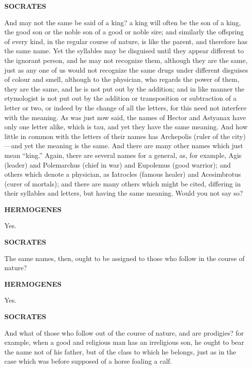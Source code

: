 \documentclass[11pt,letter]{article}
\begin{document}
\par \textbf{SOCRATES}
\par   And may not the same be said of a king? a king will often be the son of a king, the good son or the noble son of a good or noble sire; and similarly the offspring of every kind, in the regular course of nature, is like the parent, and therefore has the same name. Yet the syllables may be disguised until they appear different to the ignorant person, and he may not recognize them, although they are the same, just as any one of us would not recognize the same drugs under different disguises of colour and smell, although to the physician, who regards the power of them, they are the same, and he is not put out by the addition; and in like manner the etymologist is not put out by the addition or transposition or subtraction of a letter or two, or indeed by the change of all the letters, for this need not interfere with the meaning. As was just now said, the names of Hector and Astyanax have only one letter alike, which is tau, and yet they have the same meaning. And how little in common with the letters of their names has Archepolis (ruler of the city)—and yet the meaning is the same. And there are many other names which just mean “king.” Again, there are several names for a general, as, for example, Agis (leader) and Polemarchus (chief in war) and Eupolemus (good warrior); and others which denote a physician, as Iatrocles (famous healer) and Acesimbrotus (curer of mortals); and there are many others which might be cited, differing in their syllables and letters, but having the same meaning. Would you not say so?

\par \textbf{HERMOGENES}
\par   Yes.

\par \textbf{SOCRATES}
\par   The same names, then, ought to be assigned to those who follow in the course of nature?

\par \textbf{HERMOGENES}
\par   Yes.

\par \textbf{SOCRATES}
\par   And what of those who follow out of the course of nature, and are prodigies? for example, when a good and religious man has an irreligious son, he ought to bear the name not of his father, but of the class to which he belongs, just as in the case which was before supposed of a horse foaling a calf.
\end{document}
